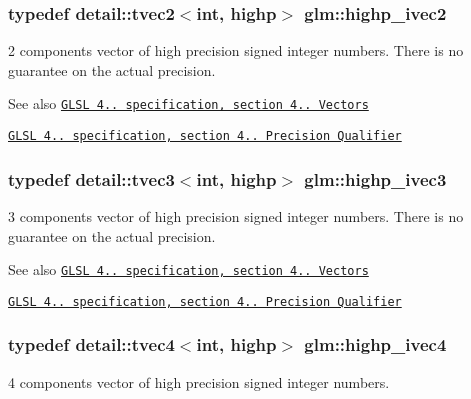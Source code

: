 \subsubsection[{\texorpdfstring{highp\+\_\+ivec2}{highp_ivec2}}]{\setlength{\rightskip}{0pt plus 5cm}typedef detail\+::tvec2$<$int, highp$>$ {\bf glm\+::highp\+\_\+ivec2}}\hypertarget{group__core__precision_gab2bac6095f51f7d7f74747afc2f6747a}{}\label{group__core__precision_gab2bac6095f51f7d7f74747afc2f6747a}
2 components vector of high precision signed integer numbers. There is no guarantee on the actual precision.

\begin{DoxySeeAlso}{See also}
\href{http://www.opengl.org/registry/doc/GLSLangSpec.4.20.8.pdf}{\tt G\+L\+SL 4.. specification, section 4.. Vectors} 

\href{http://www.opengl.org/registry/doc/GLSLangSpec.4.20.8.pdf}{\tt G\+L\+SL 4.. specification, section 4.. Precision Qualifier} 
\end{DoxySeeAlso}
\subsubsection[{\texorpdfstring{highp\+\_\+ivec3}{highp_ivec3}}]{\setlength{\rightskip}{0pt plus 5cm}typedef detail\+::tvec3$<$int, highp$>$ {\bf glm\+::highp\+\_\+ivec3}}\hypertarget{group__core__precision_gae9f0a321de8ee92dce9d4400362d71e7}{}\label{group__core__precision_gae9f0a321de8ee92dce9d4400362d71e7}
3 components vector of high precision signed integer numbers. There is no guarantee on the actual precision.

\begin{DoxySeeAlso}{See also}
\href{http://www.opengl.org/registry/doc/GLSLangSpec.4.20.8.pdf}{\tt G\+L\+SL 4.. specification, section 4.. Vectors} 

\href{http://www.opengl.org/registry/doc/GLSLangSpec.4.20.8.pdf}{\tt G\+L\+SL 4.. specification, section 4.. Precision Qualifier} 
\end{DoxySeeAlso}
\subsubsection[{\texorpdfstring{highp\+\_\+ivec4}{highp_ivec4}}]{\setlength{\rightskip}{0pt plus 5cm}typedef detail\+::tvec4$<$int, highp$>$ {\bf glm\+::highp\+\_\+ivec4}}\hypertarget{group__core__precision_gaeba08fcf78aeae954c3335d73500ff8b}{}\label{group__core__precision_gaeba08fcf78aeae954c3335d73500ff8b}
4 components vector of high precision signed integer numbers.


